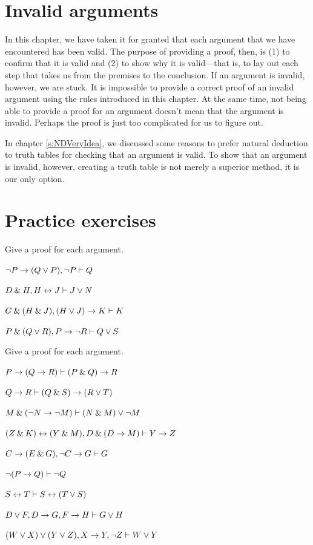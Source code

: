 \section{Invalid arguments}

In this chapter, we have taken it for granted that each argument that we have encountered has been valid. The purpose of providing a proof, then, is (1) to confirm that it is valid and (2) to show why it is valid---that is, to lay out each step that takes us from the premises to the conclusion. If an argument is invalid, however, we are stuck. It is impossible to provide a correct proof of an invalid argument using the rules introduced in this chapter. At the same time, not being able to provide a proof for an argument doesn't mean that the argument is invalid. Perhaps the proof is just too complicated for us to figure out. 

In chapter \ref{s:NDVeryIdea}, we discussed some reasons to prefer natural deduction to truth tables for checking that an argument is valid. To show that an argument is invalid, however, creating a truth table is not merely a superior method, it is our only option.



\section{Practice exercises}
\setcounter{ProbPart}{0}

\problempart
Give a proof for each argument.
\begin{earg}
\item ${\neg} P \rightarrow (Q \vee P), {\neg} P \vdash Q$\smallskip
\item $D \mathbin{\&} H, H \leftrightarrow J  \vdash J \vee N$\smallskip 
\item $G \mathbin{\&} (H \mathbin{\&} J), (H \vee J) \rightarrow K \vdash K$\smallskip
\item $P \mathbin{\&} (Q \vee R), P \rightarrow {\neg} R \vdash Q \vee S$\smallskip
\end{earg}


\problempart
Give a proof for each argument.
\begin{earg}
\item $P \rightarrow (Q \rightarrow R) \vdash (P \mathbin{\&} Q) \rightarrow R$\smallskip
\item $Q \rightarrow R \vdash (Q \mathbin{\&} S) \rightarrow (R \vee T)$\smallskip 
\item $M \mathbin{\&} ({\neg} N \rightarrow {\neg} M) \vdash (N \mathbin{\&} M) \vee {\neg} M$\smallskip
\item $(Z\mathbin{\&} K)\leftrightarrow(Y\mathbin{\&} M), D\mathbin{\&}(D\rightarrow M) \vdash Y\rightarrow Z$\smallskip
\item $C\rightarrow(E\mathbin{\&} G), {\neg} C \rightarrow G \vdash G$\smallskip
\item ${\neg}(P \rightarrow Q) \vdash {\neg} Q$\smallskip
\item $S \leftrightarrow T \vdash S \leftrightarrow (T \vee S)$\smallskip 
\item $D \vee F, D \rightarrow G, F \rightarrow H \vdash G \vee H$\smallskip
\item $(W \vee X) \vee (Y \vee Z), X\rightarrow Y, {\neg} Z \vdash W\vee Y$
\end{earg}



